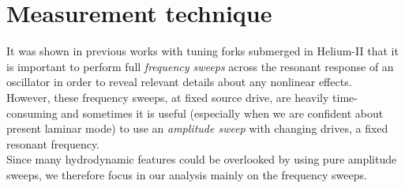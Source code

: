 \section{Measurement technique}

It was shown in previous works \cite{svoc2016} \cite{fork-exp}  with tuning forks submerged in Helium-II that it is important to perform full \textit{frequency sweeps} across the resonant response of an oscillator in order to reveal relevant details about any nonlinear effects.\\
However, these frequency sweeps, at fixed source drive, are heavily time-consuming and sometimes it is useful (especially when we are confident about present laminar mode) to use an \textit{amplitude sweep} with changing drives, a fixed resonant frequency.\\
Since many hydrodynamic features could be overlooked by using pure amplitude sweeps, we therefore focus in our analysis mainly on the frequency sweeps.


\newpage
